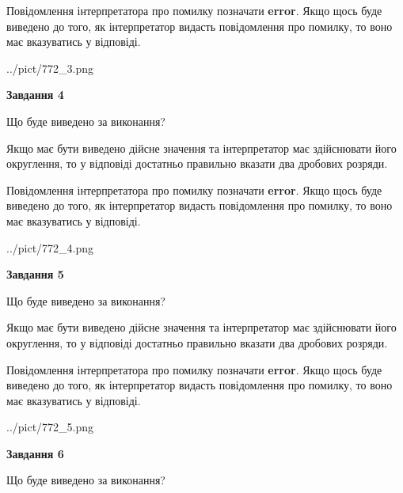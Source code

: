 \documentclass[12pt, ukrainian]{article}
\begin{document}
{\begin {Large}
Повідомлення інтерпретатора про помилку позначати \textbf{error}.
Якщо щось буде виведено до того, як інтерпретатор видасть повідомлення про помилку, 
то воно має вказуватись у відповіді. \par

\begin{center}
	{../pict/772_3.png}
\end{center}
\newpage

{\begin {center}\textbf{Завдання 4}\end {center}}\par
Що буде виведено за виконання? \par

Якщо має бути виведено дійсне значення та інтерпретатор має здійснювати його округлення, 
то у відповіді достатньо правильно вказати два дробових розряди.

Повідомлення інтерпретатора про помилку позначати \textbf{error}.
Якщо щось буде виведено до того, як інтерпретатор видасть повідомлення про помилку, 
то воно має вказуватись у відповіді. \par

\begin{center}
	{../pict/772_4.png}
\end{center}
\newpage

{\begin {center}\textbf{Завдання 5}\end {center}}\par
Що буде виведено за виконання? \par

Якщо має бути виведено дійсне значення та інтерпретатор має здійснювати його округлення, 
то у відповіді достатньо правильно вказати два дробових розряди.

Повідомлення інтерпретатора про помилку позначати \textbf{error}.
Якщо щось буде виведено до того, як інтерпретатор видасть повідомлення про помилку, 
то воно має вказуватись у відповіді. \par

\begin{center}
	{../pict/772_5.png}
\end{center}
\newpage

{\begin {center}\textbf{Завдання 6}\end {center}}\par
Що буде виведено за виконання? \par


\end{Large}}
\end{document}
